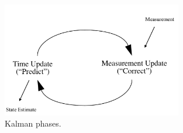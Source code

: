 \documentclass[a4paper,11pt]{kth-mag}
\begin{document}
\begin{figure}[!htb] 
\centering
\includegraphics[width = 0.7\textwidth]{Kalmanphasepic.jpg}
\caption{Kalman phases.}
\label{figure : Kalman phases}
\end{figure}
\end{document}
